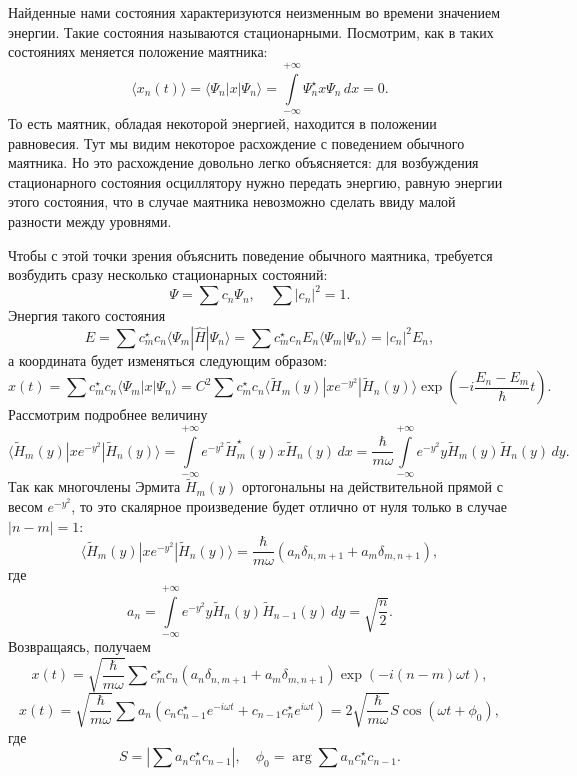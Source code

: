 Найденные нами состояния характеризуются неизменным во времени значением энергии. Такие состояния называются стационарными. Посмотрим, как в таких состояниях меняется положение маятника:
\[
    \langle x_n(t) \rangle = \langle \Psi_n | x | \Psi_n \rangle = \int\limits_{-\infty}^{+\infty}
    \Psi_n^\star  x \Psi_n\, dx = 0.
\]
То есть маятник, обладая некоторой энергией, находится в положении равновесия. Тут мы видим некоторое расхождение с поведением обычного маятника. Но это расхождение довольно легко объясняется: для возбуждения стационарного состояния осциллятору нужно передать энергию, равную энергии этого состояния, что в случае маятника невозможно сделать ввиду малой разности между уровнями.

Чтобы с этой точки зрения объяснить поведение обычного маятника, требуется возбудить сразу несколько стационарных состояний:
\[
    \Psi = \sum c_n \Psi_n,\quad \sum |c_n|^2 = 1.
\]
Энергия такого состояния
\[
    E = \sum c_m^\star c_n \langle\Psi_m|\hat{H}|\Psi_n\rangle = \sum c_m^\star c_n E_n\langle\Psi_m|\Psi_n\rangle = |c_n|^2 E_n,
\]
а координата будет изменяться следующим образом:
\[
    x(t) = \sum c_m^\star c_n \langle\Psi_m|x|\Psi_n\rangle = C^2\sum c_m^\star c_n \langle \tilde{H}_m(y) | x e^{-y^2} | \tilde{H}_n(y)\rangle \exp\left(-i\frac{E_n-E_m}{\hbar}t\right).
\]
Рассмотрим подробнее величину
\[
    \langle \tilde{H}_m(y) | xe^{-y^2} | \tilde{H}_n(y)\rangle = \int\limits_{-\infty}^{+\infty} e^{-y^2}\tilde{H}_m^\star (y) x \tilde{H}_n(y)\, dx = \frac{\hbar}{m\omega} \int\limits_{-\infty}^{+\infty} e^{-y^2} y \tilde{H}_m(y) \tilde{H}_n(y)\, dy.
\]
Так как многочлены Эрмита \( \tilde{H}_m(y) \) ортогональны на действительной прямой с весом \( e^{-y^2} \), то это скалярное произведение будет отлично от нуля только в случае \( |n - m| = 1 \):
\[
    \langle \tilde{H}_m(y) | xe^{-y^2} | \tilde{H}_n(y)\rangle =
    \frac{\hbar}{m\omega}(a_n\delta_{n, m+1} + a_m\delta_{m, n+1}),
\]
где
\[
    a_n = \int\limits_{-\infty}^{+\infty} e^{-y^2} y \tilde{H}_n(y) \tilde{H}_{n-1}(y)\, dy = \sqrt{\frac{n}{2}}.
\]
Возвращаясь, получаем
\[
    x(t) = \sqrt{\frac{\hbar}{m\omega}}\sum c_m^\star c_n (a_n\delta_{n, m+1} + a_m\delta_{m, n+1}) \exp(-i(n-m)\omega t),
\]
\[
    x(t) = \sqrt{\frac{\hbar}{m\omega}}\sum  a_n (c_n c_{n-1}^\star  e^{-i\omega t}+ c_{n-1} c_n^\star  e^{i\omega t}) = 
    2\sqrt{\frac{\hbar}{m\omega}}S  \cos(\omega t + \phi_0),
\]
где
\[
    S = \left|\sum a_n c_n^\star  c_{n-1}\right|,\quad
    \phi_0 = \arg \sum a_n c_n^\star  c_{n-1}.
\]

